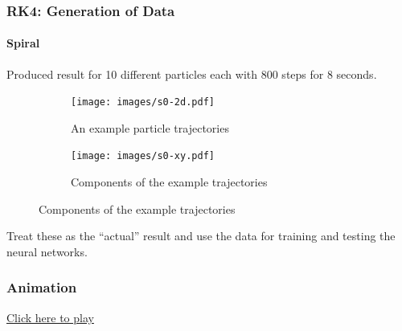 \documentclass{beamer}
\begin{document}
\begin{frame}[t]
	\frametitle{RK4: Generation of Data}
	\framesubtitle{Spiral}
	Produced result for 10 different particles each with 800 steps for 8 seconds. \\

	\begin{figure}
	    \centering
	    \begin{subfigure}[b]{0.45\textwidth}
	      \centering
	      \texttt{[image: images/s0-2d.pdf]}
	      \caption{An example particle trajectories}
	      \label{fig:p03d}
	    \end{subfigure}
	    \hfill
	    \begin{subfigure}[b]{0.45\textwidth}
	      \centering
	      \texttt{[image: images/s0-xy.pdf]}
	      \caption{Components of the example trajectories}
	      \label{fig:p0-xyz}
	    \end{subfigure}
	  \end{figure}
	Treat these as the ``actual'' result and use the data for training and testing the neural networks. 
\end{frame}

\begin{frame}[t]
	\begin{center}
	\frametitle{Animation}
	  
	  \href{file:images/p0-animation.mp4}{Click here to play}
  \end{center}
\end{frame}
\end{document}
